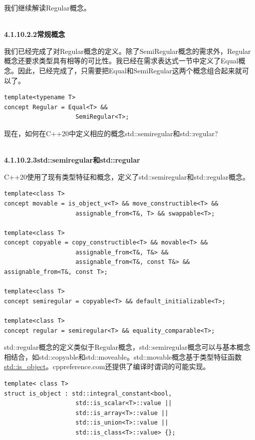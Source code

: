 我们继续解读Regular概念。

\hspace*{\fill} \\ %
\noindent
\textbf{4.1.10.2.2\hspace{0.2cm}常规概念}

我们已经完成了对Regular概念的定义。除了SemiRegular概念的需求外，Regular概念还要求类型具有相等的可比性。我已经在需求表达式一节中定义了Equal概念。因此，已经完成了，只需要把Equal和SemiRegular这两个概念组合起来就可以了。

\begin{lstlisting}[style=styleCXX]
template<typename T>
concept Regular = Equal<T> &&
					SemiRegular<T>;
\end{lstlisting}

现在，如何在C++20中定义相应的概念std::semiregular和std::regular?

\hspace*{\fill} \\ %
\noindent
\textbf{4.1.10.2.3\hspace{0.2cm}std::semiregular和std::regular}

C++20使用了现有类型特征和概念，定义了std::semiregular和std::regular概念。

\begin{lstlisting}[style=styleCXX]
template<class T>
concept movable = is_object_v<T> && move_constructible<T> &&
					assignable_from<T&, T> && swappable<T>;

template<class T>
concept copyable = copy_constructible<T> && movable<T> &&
					assignable_from<T&, T&> &&
					assignable_from<T&, const T&> && assignable_from<T&, const T>;

template<class T>
concept semiregular = copyable<T> && default_initializable<T>;

template<class T>
concept regular = semiregular<T> && equality_comparable<T>;
\end{lstlisting}

std::regular概念的定义类似于Regular概念，std::semiregular概念可以与基本概念相结合，如std::copyable和std::moveable。std::movable概念基于类型特征函数\href{https://en.cppreference.com/w/cpp/types/is_object}{std::is\_object}。cppreference.com还提供了编译时谓词的可能实现。

\begin{lstlisting}[style=styleCXX]
template< class T>
struct is_object : std::integral_constant<bool,
					std::is_scalar<T>::value ||
					std::is_array<T>::value ||
					std::is_union<T>::value ||
					std::is_class<T>::value> {};
\end{lstlisting}

